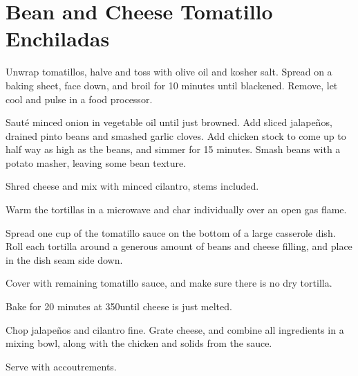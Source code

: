 \section{Bean and Cheese Tomatillo Enchiladas}
\begin{recipe}


Unwrap tomatillos, halve and toss with olive oil and kosher salt. Spread on a
baking sheet, face down, and broil for 10 minutes until blackened. Remove, let
cool and pulse in a food processor.


Sauté minced onion in vegetable oil until just browned. Add sliced jalapeños,
drained pinto beans and smashed garlic cloves. Add chicken stock to come up to
half way as high as the beans, and simmer for 15 minutes. Smash beans with a
potato masher, leaving some bean texture.


Shred cheese and mix with minced cilantro, stems included.


Warm the tortillas in a microwave and char individually over an open gas flame.

Spread one cup of the tomatillo sauce on the bottom of a large casserole dish.
Roll each tortilla around a generous amount of beans and cheese filling, and
place in the dish seam side down.

Cover with remaining tomatillo sauce, and make sure there is no dry tortilla.

Bake for 20 minutes at 350\degree until cheese is just melted.


Chop jalapeños and cilantro fine. Grate cheese, and combine all ingredients in a mixing bowl, along with the chicken and solids from the sauce.


Serve with accoutrements.

\end{recipe}
